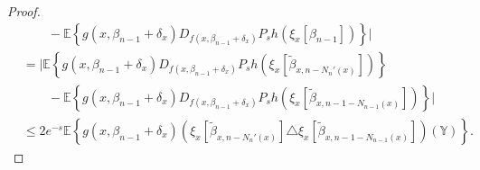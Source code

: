 \documentclass[AHL,Unicode,longabstracts]{cedram}
\newcommand*\Y{\mathbb{Y}}
\newcommand{\E}{\mathbb{E}}
\newcommand{\mean}[1] {\E\left\{{#1}\right\}}
\begin{document}
\begin{proof}
\begin{align*}
& \qquad - \mean{g\left(x,\beta_{n-1}+\delta_x\right) D_{f\left(x,\beta_{n-1}+\delta_x\right)}P_sh\left(\xi_x\left[\beta_{n-1}\right]\right)} \big| \\
& = \big| \mean{g\left(x,\beta_{n-1}+\delta_x\right) D_{f\left(x,\beta_{n-1}+\delta_x\right)}P_sh\left(\xi_x\left[\widetilde{\beta}_{x,n-N_{n}'(x)}\right]\right) } \\
& \qquad - \mean{g\left(x,\beta_{n-1}+\delta_x\right) D_{f\left(x,\beta_{n-1}+\delta_x\right)}P_sh\left(\xi_x\left[\widetilde{\beta}_{x,n-1-N_{n-1}(x)}\right]\right)} \big| \\
& \leq 2 e^{-s} \mean{ g\left(x,\beta_{n-1}+\delta_x\right) {\left(\xi_x\left[\widetilde{\beta}_{x,n-N_{n}'(x)}\right] \triangle \xi_x\left[\widetilde{\beta}_{x,n-1-N_{n-1}(x)}\right]\right)(\Y)}}.
\end{align*}


\end{proof}
\end{document}
